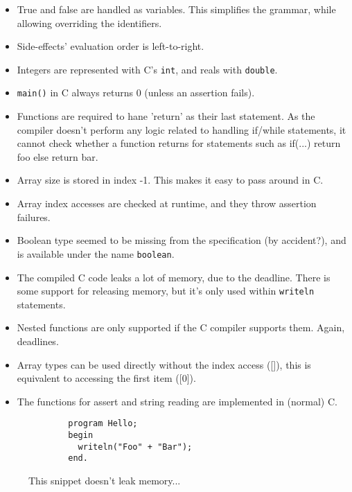 \documentclass{article}
\def\pascallexer{pascal.py:DelphiLexer -x}
\begin{document}
\begin{itemize}
    \item True and false are handled as variables. This simplifies the grammar,
        while allowing overriding the identifiers.
    \item Side-effects' evaluation order is left-to-right.
    \item Integers are represented with C's \texttt{int}, and reals with
        \texttt{double}.
    \item \texttt{main()} in C always returns 0 (unless an assertion fails).
    \item Functions are required to hane 'return' as their last statement. As
        the compiler doesn't perform any logic related to handling if/while
        statements, it cannot check whether a function returns for statements
        such as if(...) return foo else return bar.
    \item Array size is stored in index -1. This makes it easy to pass around
        in C.
    \item Array index accesses are checked at runtime, and they throw assertion
        failures.
    \item Boolean type seemed to be missing from the specification (by
        accident?), and is available under the name \texttt{boolean}.
    \item The compiled C code leaks a lot of memory, due to the deadline. There
        is some support for releasing memory, but it's only used within
        \texttt{writeln} statements.
    \item Nested functions are only supported if the C compiler supports them.
        Again, deadlines.
    \item Array types can be used directly without the index access ([]), this
        is equivalent to accessing the first item ([0]).
    \item The functions for assert and string reading are implemented in
        (normal) C.
\end{itemize}

\FloatBarrier

\begin{figure}[ht!]
    \begin{verbatim}
        program Hello;
        begin
          writeln("Foo" + "Bar");
        end.
    \end{verbatim}
    \caption{This snippet doesn't leak memory...}
\end{figure}
\end{document}
